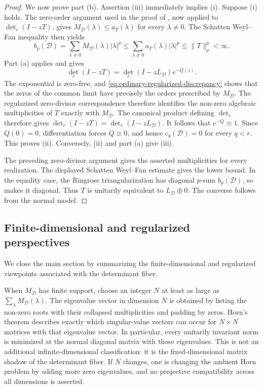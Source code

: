 \begin{proof}
  We now prove part \textup{(b)}.  Assertion \textup{(iii)} immediately
  implies \textup{(i)}.  Suppose \textup{(i)} holds.  The zero-order argument
  used in the proof of , now applied to
  \(\det_r(I-zT)\), gives
  \(M_{\mathcal D}(\lambda)\le a_T(\lambda)\) for every
  \(\lambda\ne0\).  The Schatten Weyl--Fan inequality then yields
  \[
    b_p(\mathcal D)
    =\sum_{\lambda\ne0}M_{\mathcal D}(\lambda)|\lambda|^p
    \le\sum_{\lambda\ne0}a_T(\lambda)|\lambda|^p
    \le\|T\|_p^p<\infty.
  \]
  Part \textup{(a)} applies and gives
  \[
    \det_r(I-zT)
    =\det_r(I-zL_{\mathcal D})e^{-Q(z)}.
  \]
  The exponential is zero-free, and
  \eqref{eq:ordinary-regularized-discrepancy} shows that the zeros of the
  common limit have precisely the orders prescribed by \(M_{\mathcal D}\).
  The regularized zero-divisor correspondence therefore identifies the
  non-zero algebraic multiplicities of \(T\) exactly with
  \(M_{\mathcal D}\).  The canonical product defining
  \(\det_r\) therefore gives
  \(\det_r(I-zT)=\det_r(I-zL_{\mathcal D})\).  It follows that
  \(e^{-Q}\equiv1\).  Since \(Q(0)=0\), differentiation forces
  \(Q\equiv0\), and hence \(c_q(\mathcal D)=0\) for every \(q<r\).
  This proves \textup{(ii)}.  Conversely, \textup{(ii)} and part
  \textup{(a)} give \textup{(iii)}.

  The preceding zero-divisor argument gives the asserted multiplicities for
  every realization.  The displayed Schatten Weyl--Fan estimate gives the
  lower bound.  In the equality case, the Ringrose triangularization has
  diagonal \(p\)-sum \(b_p(\mathcal D)\), so
   makes it diagonal.  Thus
  \(T\) is unitarily equivalent to \(L_{\mathcal D}\oplus0\).  The converse
  follows from the normal model.
\end{proof}


\subsection{Finite-dimensional and regularized perspectives}

We close the main section by summarizing the finite-dimensional and
regularized viewpoints associated with the determinant fiber.

When \(M_{\mathcal D}\) has finite support, choose an integer \(N\) at least as
large as \(\sum_{\lambda}M_{\mathcal D}(\lambda)\).  The eigenvalue vector in dimension \(N\)
is obtained by listing the non-zero roots with their collapsed multiplicities
and padding by zeros.  Horn's theorem describes exactly which singular-value
vectors can occur for \(N\times N\) matrices with that eigenvalue vector.  In
particular, every unitarily invariant norm is minimized at the normal diagonal
matrix with those eigenvalues.  This is not an additional infinite-dimensional
classification: it is the fixed-dimensional matrix shadow of the determinant
fiber.  If \(N\) changes, one is changing the ambient Horn problem by adding
more zero eigenvalues, and no projective compatibility across all dimensions is
asserted.

